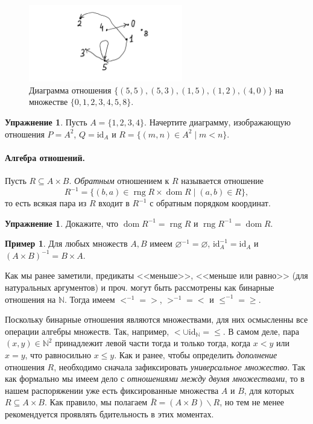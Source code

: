 \documentclass[12pt,notitlepage]{article}
\theoremstyle{plain}
\theoremstyle{definition}
\newtheorem{exc}[thm]{Упражнение}
\newtheorem{exm}[thm]{Пример}
\theoremstyle{plain}
\newcommand{\N}{\mathbb{N}}
\newcommand{\sbs}{\subseteq}
\renewcommand{\setminus}{\smallsetminus}
\newcommand{\void}{\varnothing}
\newcommand{\dom}{\mathop{\mathrm{dom}}}
\newcommand{\rng}{\mathop{\mathrm{rng}}}
\newcommand{\id}{\mathrm{id}}
\newcommand{\1}{\mathbf{1}}
\newcommand{\0}{\mathbf{0}}
\begin{document}
\begin{figure}[h]
	\centering
	\includegraphics*[width=0.6\textwidth]{rel_diag.pdf}
	\caption{Диаграмма отношения $\{ (5,5), (5,3), (1,5), (1,2), (4, 0) \}$ на множестве $\{0, 1, 2, 3, 4, 5, 8\}$.}
\end{figure}


\begin{exc}
	Пусть $A = \{1,2,3,4\}$. Начертите диаграмму, изображающую отношения $P = A^2$, $Q = \id_A$ и $R = \{ (m,n) \in A^2 \mid m < n\}$.
\end{exc}

\paragraph{Алгебра отношений.} Пусть $R \sbs A \times B$. \emph{Обратным} отношением к $R$ называется отношение
$$R^{-1} = \{(b,a) \in \rng R \times \dom R \mid (a, b) \in R\},$$
то есть всякая пара из $R$ входит в $R^{-1}$ с обратным порядком координат.

\begin{exc}
	Докажите, что $\dom R^{-1} = \rng R$ и $\rng R^{-1} = \dom R$.
\end{exc}

\begin{exm}
	Для любых множеств $A, B$ имеем $\void^{-1} = \void$, $\id^{-1}_A = \id_A$ и $(A \times B)^{-1} = B \times A$.
	
	Как мы ранее заметили, предикаты <<меньше>>, <<меньше или равно>> (для натуральных аргументов) и проч. могут быть рассмотрены как бинарные отношения на $\N$. Тогда имеем ${<}^{-1} = {>}$, ${>}^{-1} = {<}$ и ${\leq}^{-1} = {\geq}$.
\end{exm}

Поскольку бинарные отношения являются множествами, для них осмысленны все операции алгебры множеств. Так, например, ${<} \cup \id_\N = {\leq}$. В самом деле, пара $(x, y) \in \N^2$ принадлежит левой части тогда и только тогда, когда $x < y$ или $x = y$, что равносильно $x \leq y$. Как и ранее, чтобы определить \emph{дополнение} отношения $R$, необходимо сначала зафиксировать \emph{универсальное множество}. Так как формально мы имеем дело с \emph{отношениями между двумя множествами}, то в нашем распоряжении уже есть фиксированные множества $A$ и $B$, для которых $R \sbs A \times B$. Как правило, мы полагаем $\bar R = (A \times B) \setminus R$, но тем не менее рекомендуется проявлять бдительность в этих моментах.
\end{document}
